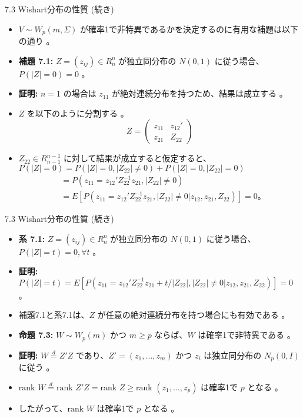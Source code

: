 \documentclass[aspectratio=169]{beamer}
\begin{document}
\begin{CJK}{UTF8}{min}
\begin{frame}{7.3 Wishart分布の性質 (続き)}
\begin{itemize}
    \item $V \sim W_p(m, \Sigma)$ が確率1で非特異であるかを決定するのに有用な補題は以下の通り 。
    \item \textbf{補題 7.1:} $Z = (z_{ij}) \in R_n^n$ が独立同分布の $N(0, 1)$ に従う場合、$P(|Z| = 0) = 0$ 。
    \item \textbf{証明:} $n=1$ の場合は $z_{11}$ が絶対連続分布を持つため、結果は成立する 。
    \item $Z$ を以下のように分割する 。
    \begin{equation*}
    Z = \begin{pmatrix} z_{11} & z_{12}' \\ z_{21} & Z_{22} \end{pmatrix} 
    \end{equation*}
    \item $Z_{22} \in R_{n-1}^{n-1}$ に対して結果が成立すると仮定すると、$P(|Z|=0) = P(|Z|=0, |Z_{22}| \ne 0) + P(|Z|=0, |Z_{22}|=0)$ 
    \begin{align*}
    &= P(z_{11} = z_{12}'Z_{22}^{-1}z_{21}, |Z_{22}| \ne 0) \\
    &= E[P(z_{11} = z_{12}'Z_{22}^{-1}z_{21}, |Z_{22}| \ne 0 | z_{12}, z_{21}, Z_{22})] = 0 \text{。} 
    \end{align*}
\end{itemize}
\end{frame}

\begin{frame}{7.3 Wishart分布の性質 (続き)}
\begin{itemize}
    \item \textbf{系 7.1:} $Z = (z_{ij}) \in R_n^n$ が独立同分布の $N(0, 1)$ に従う場合、$P(|Z| = t) = 0, \forall t$ 。
    \item \textbf{証明:} $P(|Z| = t) = E[P(z_{11} = z_{12}'Z_{22}^{-1}z_{21} + t/|Z_{22}|, |Z_{22}| \ne 0 | z_{12}, z_{21}, Z_{22})] = 0$ 。
    \item 補題7.1と系7.1は、$Z$ が任意の絶対連続分布を持つ場合にも有効である 。
    \item \textbf{命題 7.3:} $W \sim W_p(m)$ かつ $m \ge p$ ならば、$W$ は確率1で非特異である 。
    \item \textbf{証明:} $W \overset{d}{=} Z'Z$ であり、$Z' = (z_1, \dots, z_m)$ かつ $z_i$ は独立同分布の $N_p(0, I)$ に従う 。
    \item $\text{rank } W \overset{d}{=} \text{rank } Z'Z = \text{rank } Z \ge \text{rank } (z_1, \dots, z_p)$ は確率1で $p$ となる 。
    \item したがって、$\text{rank } W$ は確率1で $p$ となる 。
\end{itemize}
\end{frame}


\end{CJK}
\end{document}
